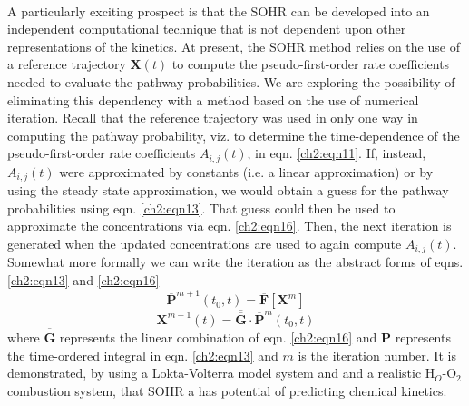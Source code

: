 \paragraph{}
A particularly exciting prospect is that the SOHR can be developed into an
independent computational technique that is not dependent upon other representations 
of the kinetics. At present, the SOHR method relies on the use of a reference trajectory
$\mathbf{X}(t)$ to compute the pseudo-first-order rate coefficients needed to evaluate the pathway
probabilities. We are exploring the possibility of eliminating this dependency with a
method based on the use of numerical iteration.\cite{ch1_IRPC_18_bai2017simulating} Recall that the reference trajectory
was used in only one way in computing the pathway probability, viz. to determine the
time-dependence of the pseudo-first-order rate coefficients $A_{i,j}(t)$, in eqn. \ref{ch2:eqn11}. If,
instead, $A_{i,j}(t)$ were approximated by constants (i.e. a linear approximation) or by using
the steady state approximation, we would obtain a guess for the pathway probabilities
using eqn. \ref{ch2:eqn13}. That guess could then be used to approximate the concentrations
via eqn. \ref{ch2:eqn16}. Then, the next iteration is generated when the updated concentrations
are used to again compute $A_{i,j}(t)$. Somewhat more formally we can write the iteration
as the abstract forms of eqns. \ref{ch2:eqn13} and \ref{ch2:eqn16}
\begin{equation*}
{\overline{\mathbf{P}}}^{m+1}(t_0,t) = \overline{\mathbf{F}} \left[ {\mathbf{X}}^{m} \right]
\end{equation*}
\begin{equation*}
{\mathbf{X}}^{m+1}(t) = \overline{\overline{\mathbf{G}}} \cdot {\overline{\mathbf{P}}}^{m}(t_0,t)
\end{equation*}
where $\overline{\overline{\mathbf{G}}}$ represents the linear combination of eqn. \ref{ch2:eqn16} and ${\overline{\mathbf{P}}}$ represents the
time-ordered integral in eqn. \ref{ch2:eqn13} and $m$ is the iteration number. It is demonstrated, by using a Lokta-Volterra model system and and a realistic H$_O$-O$_2$ combustion system, that SOHR a has potential of predicting chemical kinetics.